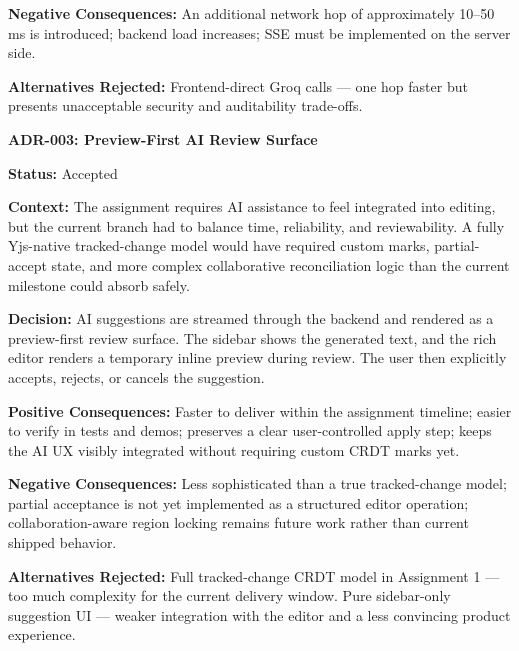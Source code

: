 \documentclass{article}
\begin{document}
\vspace{3pt}
\noindent\textbf{Negative Consequences:} An additional network hop of approximately 10--50\,ms is introduced; backend load increases; SSE must be implemented on the server side.

\vspace{3pt}
\noindent\textbf{Alternatives Rejected:} Frontend-direct Groq calls — one hop faster but presents unacceptable security and auditability trade-offs.

\vspace{15pt}
\noindent\textbf{ADR-003: Preview-First AI Review Surface}

\vspace{3pt}
\noindent\textbf{Status:} Accepted

\vspace{3pt}
\noindent\textbf{Context:} The assignment requires AI assistance to feel integrated into editing, but the current branch had to balance time, reliability, and reviewability. A fully Yjs-native tracked-change model would have required custom marks, partial-accept state, and more complex collaborative reconciliation logic than the current milestone could absorb safely.

\vspace{3pt}
\noindent\textbf{Decision:} AI suggestions are streamed through the backend and rendered as a preview-first review surface. The sidebar shows the generated text, and the rich editor renders a temporary inline preview during review. The user then explicitly accepts, rejects, or cancels the suggestion.

\vspace{3pt}
\noindent\textbf{Positive Consequences:} Faster to deliver within the assignment timeline; easier to verify in tests and demos; preserves a clear user-controlled apply step; keeps the AI UX visibly integrated without requiring custom CRDT marks yet.

\vspace{3pt}
\noindent\textbf{Negative Consequences:} Less sophisticated than a true tracked-change model; partial acceptance is not yet implemented as a structured editor operation; collaboration-aware region locking remains future work rather than current shipped behavior.

\vspace{3pt}
\noindent\textbf{Alternatives Rejected:} Full tracked-change CRDT model in Assignment 1 — too much complexity for the current delivery window. Pure sidebar-only suggestion UI — weaker integration with the editor and a less convincing product experience.
\end{document}
